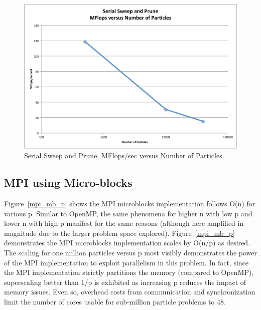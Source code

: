 \documentclass[11pt]{article} %
\begin{document}
\begin{figure}
\begin{centering}
\includegraphics[width=0.5\paperwidth]{figures/serial_flops_v_n}
\par\end{centering}

\caption{Serial Sweep and Prune. MFlops/sec versus Number of Particles.}
\label{plot:serial_flops_v_n}
\end{figure}


\subsection{MPI using Micro-blocks}

Figure~\ref{mpi_mb_n} shows the MPI microblocks implementation follows O(n) for various p. Similar to OpenMP, the same phenomena for higher n with low p and lower n with high p manifest for the same reasons (although here amplified in magnitude due to the larger problem space explored). Figure~\ref{mpi_mb_p} demonstrates the MPI microblocks implementation scales by O(n/p) as desired. The scaling for one million particles versus p most visibly demonstrates the power of the MPI implementation to exploit parallelism in this problem. In fact, since the MPI implementation strictly partitions the memory (compared to OpenMP), superscaling better than 1/p is exhibited as increasing p reduces the impact of memory issues. Even so, overhead costs from communication and synchronization limit the number of cores usable for sub-million particle problems to 48.
\end{document}
